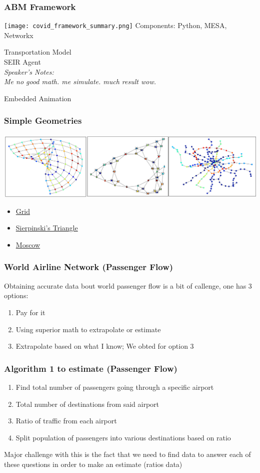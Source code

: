 \documentclass{beamer}
\begin{document}
\begin{frame}
\frametitle{ABM Framework}
\texttt{[image: covid\_framework\_summary.png]}
Components: Python, MESA, Networkx

Transportation Model\\
SEIR Agent\\
\textit{Speaker's Notes:\\
Me no good math. me simulate.
much result wow.}
  
\begin{frame}{Embedded Animation}
\frametitle{Simple Geometries}
\includegraphics[width=1.0\textwidth]{geometries_example.png}
\begin{itemize}
    \item \href{https://github.com/cheung-ho-lum/NS_Epidemics_ABM_Approach/blob/master/Repository/Visualizations/infection_timelapse_grid_01.gif}{Grid}
    \item \href{https://github.com/cheung-ho-lum/NS_Epidemics_ABM_Approach/blob/master/Repository/Visualizations/infection_timelapse_sierpinski_01.gif}{Sierpinski's Triangle}
    \item \href{https://github.com/cheung-ho-lum/NS_Epidemics_ABM_Approach/blob/master/Repository/Visualizations/infection_timelapse_moscow.gif}{Moscow}
\end{itemize}
\end{frame}
\begin{frame}
\frametitle{World Airline Network (Passenger Flow)}
Obtaining accurate data bout world passenger flow is a bit of callenge, one has 3 options:
\begin{enumerate}
	\item Pay for it
	\item Using superior math to extrapolate or estimate
	\item Extrapolate based on what I know; We obted for option 3 
\end{enumerate}
\end{frame}
\begin{frame}
\frametitle{Algorithm 1 to estimate (Passenger Flow)}
\begin{enumerate}
	\item Find total number of passengers going through a specific airport
	\item Total number of destinations from said airport
	\item Ratio of traffic from each airport
	\item Split population of passengers into various destinations based on ratio 
\end{enumerate}
Major challenge with this is the fact that we need to find data to answer each of these questions  in order to make an estimate (ratios data)
\end{frame}


\end{frame}
\end{document}
